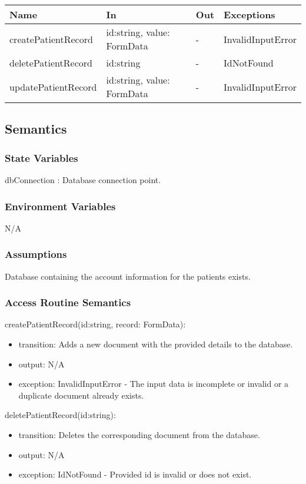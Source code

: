\documentclass[12pt, titlepage]{article}
\begin{document}
\begin{center}
\begin{tabular}{p{4cm} p{4.5cm} p{1cm} p{2.5cm}}
\hline
\textbf{Name} & \textbf{In} & \textbf{Out} & \textbf{Exceptions} \\
\hline
createPatientRecord & id:string, value: FormData & - & InvalidInputError \\
deletePatientRecord & id:string & - & IdNotFound\\
updatePatientRecord & id:string, value: FormData & - & InvalidInputError \\
\hline
\end{tabular}
\end{center}

\subsection{Semantics}

\subsubsection{State Variables}
dbConnection : Database connection point.

\subsubsection{Environment Variables}
N/A

\subsubsection{Assumptions}
Database containing the account information for the patients exists.

\subsubsection{Access Routine Semantics}

\noindent createPatientRecord(id:string, record: FormData):
\begin{itemize}
\item transition: Adds a new document with the provided details to the database.
\item output: N/A
\item exception: InvalidInputError - The input data is incomplete or invalid or a duplicate document already exists.
\end{itemize}

\noindent deletePatientRecord(id:string):
\begin{itemize}
\item transition: Deletes the corresponding document from the database.
\item output: N/A
\item exception: IdNotFound - Provided id is invalid or does not exist.
\end{itemize}
\end{document}
